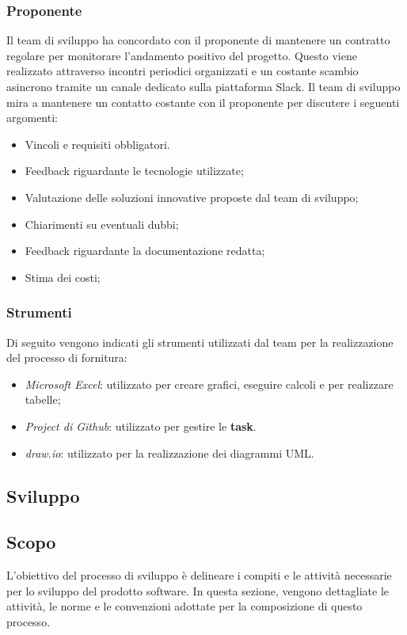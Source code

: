 \documentclass{article}
\begin{document}
\subsubsection{Proponente}
Il team di sviluppo ha concordato con il proponente di mantenere un contratto regolare per monitorare l'andamento positivo del progetto. Questo viene realizzato attraverso incontri periodici organizzati e un costante scambio asincrono tramite un canale dedicato sulla piattaforma Slack. Il team di sviluppo mira a mantenere un contatto costante con il proponente per discutere i seguenti argomenti:
\begin{itemize}
    \item Vincoli e requisiti obbligatori.
    \item Feedback riguardante le tecnologie utilizzate;
    \item Valutazione delle soluzioni innovative proposte dal team di sviluppo;
    \item Chiarimenti su eventuali dubbi;
    \item Feedback riguardante la documentazione redatta;
    \item Stima dei costi;
\end{itemize}

\subsubsection*{Strumenti}
Di seguito vengono indicati gli strumenti utilizzati dal team per la realizzazione del processo di fornitura:\begin{itemize}
    \item \textit{Microsoft Excel}: utilizzato per creare grafici, eseguire calcoli e per realizzare tabelle;
    \item \textit{Project di Github}: utilizzato per gestire le \textbf{task}.
    \item \textit{draw.io}: utilizzato per la realizzazione dei diagrammi UML.
\end{itemize}

\subsection{Sviluppo}

\subsection{Scopo}
L'obiettivo del processo di sviluppo è delineare i compiti e le attività necessarie per lo sviluppo del prodotto software. In questa sezione, vengono dettagliate le attività, le norme e le convenzioni adottate per la composizione di questo processo.
\end{document}
